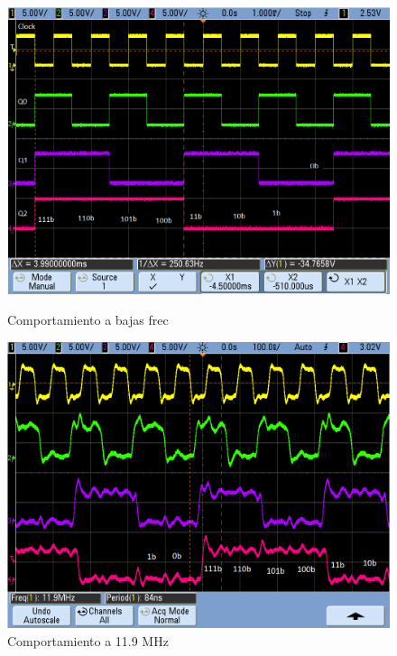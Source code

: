 \begin{figure}[H]
\begin{center}
  \begin{minipage}[b]{0.4\textwidth}
  	\begin{center}
  		\includegraphics[scale=0.2]{ejercicio7/imagenes/async.png}
  	\end{center}
  \caption{Comportamiento a bajas frec}
  \label{7_fig4}
  \end{minipage}
  \begin{minipage}[b]{0.4\textwidth}
  	\begin{center}
  		\includegraphics[scale=0.2]{ejercicio7/imagenes/async2.png}
  	\end{center}
  \caption{Comportamiento a 11.9 MHz}

\end{minipage}
\end{center}
\end{figure}

